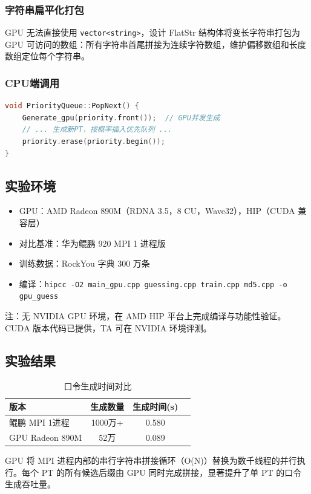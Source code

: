 \documentclass[12pt,a4paper]{article}
\begin{document}
\subsubsection*{字符串扁平化打包}
GPU 无法直接使用 \texttt{vector<string>}，设计 FlatStr 结构体将变长字符串打包为 GPU 可访问的数组：所有字符串首尾拼接为连续字符数组，维护偏移数组和长度数组定位每个字符串。

\subsubsection*{CPU端调用}
\begin{lstlisting}[language=C++]
void PriorityQueue::PopNext() {
    Generate_gpu(priority.front());  // GPU并发生成
    // ... 生成新PT，按概率插入优先队列 ...
    priority.erase(priority.begin());
}
\end{lstlisting}

\subsection{实验环境}
\begin{itemize}
    \item GPU：AMD Radeon 890M（RDNA 3.5，8 CU，Wave32），HIP（CUDA 兼容层）
    \item 对比基准：华为鲲鹏 920 MPI 1 进程版
    \item 训练数据：RockYou 字典 300 万条
    \item 编译：\texttt{hipcc -O2 main\_gpu.cpp guessing.cpp train.cpp md5.cpp -o gpu\_guess}
\end{itemize}
注：无 NVIDIA GPU 环境，在 AMD HIP 平台上完成编译与功能性验证。CUDA 版本代码已提供，TA 可在 NVIDIA 环境评测。

\subsection{实验结果}

\begin{table}[H]
\centering
\caption{口令生成时间对比}
\begin{tabular}{lccc}
\toprule
版本 & 生成数量 & 生成时间(s) \\
\midrule
鲲鹏 MPI 1进程 & 1000万+ & 0.580 \\
GPU Radeon 890M & 52万  & 0.089 \\
\bottomrule
\end{tabular}
\end{table}

GPU 将 MPI 进程内部的串行字符串拼接循环（O(N)）替换为数千线程的并行执行。每个 PT 的所有候选后缀由 GPU 同时完成拼接，显著提升了单 PT 的口令生成吞吐量。
\end{document}
